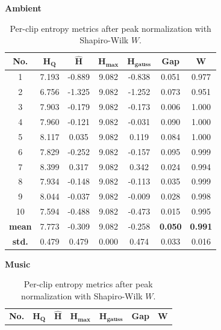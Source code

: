 \documentclass[a4paper,10pt]{article}
\theoremstyle{nonumberplain}
\theoremstyle{nonumberplain}
\theoremstyle{nonumberplain}
\theoremstyle{nonumberplain}
\begin{document}
\begin{table}[H]
    \centering
    \caption{Per-clip entropy metrics after peak normalization with Shapiro-Wilk $W$.}
    \label{tab:q3_normalized}
    {\normalsize
    \begin{minipage}[t]{0.48\textwidth}
        \centering
        \textbf{Ambient}\\
        \vspace{0.1cm}
        \setlength{\tabcolsep}{3.5pt}
        \begin{tabular}{c c c c c c c}
    \hline
    \textbf{No.} & $\mathbf{H_Q}$ & $\mathbf{\hat{H}}$ & $\mathbf{H_{max}}$ & $\mathbf{H_{gauss}}$ & \textbf{Gap} & $\mathbf{W}$ \\
    \hline
    1 & 7.193 & -0.889 & 9.082 & -0.838 & 0.051 & 0.977 \\
    2 & 6.756 & -1.325 & 9.082 & -1.252 & 0.073 & 0.951 \\
    3 & 7.903 & -0.179 & 9.082 & -0.173 & 0.006 & 1.000 \\
    4 & 7.960 & -0.121 & 9.082 & -0.031 & 0.090 & 1.000 \\
    5 & 8.117 & 0.035 & 9.082 & 0.119 & 0.084 & 1.000 \\
    6 & 7.829 & -0.252 & 9.082 & -0.157 & 0.095 & 0.999 \\
    7 & 8.399 & 0.317 & 9.082 & 0.342 & 0.024 & 0.994 \\
    8 & 7.934 & -0.148 & 9.082 & -0.113 & 0.035 & 0.999 \\
    9 & 8.044 & -0.037 & 9.082 & -0.009 & 0.028 & 0.998 \\
    10 & 7.594 & -0.488 & 9.082 & -0.473 & 0.015 & 0.995 \\
    \hline
    \textbf{mean} & 7.773 & -0.309 & 9.082 & -0.258 & \textbf{0.050} & \textbf{0.991} \\
    \textbf{std.} & 0.479 & 0.479 & 0.000 & 0.474 & 0.033 & 0.016 \\
    \hline
    \end{tabular}
    \end{minipage}\hfill
    \begin{minipage}[t]{0.48\textwidth}
        \centering
        \textbf{Music}\\
        \vspace{0.1cm}
        \setlength{\tabcolsep}{3pt}
        \begin{tabular}{c c c c c c c}
            \hline
            \textbf{No.} & $\mathbf{H_Q}$ & $\mathbf{\hat{H}}$ & $\mathbf{H_{max}}$ & $\mathbf{H_{gauss}}$ & \textbf{Gap} & $\mathbf{W}$ \\

\end{tabular}
\end{minipage}}
\end{table}
\end{document}
